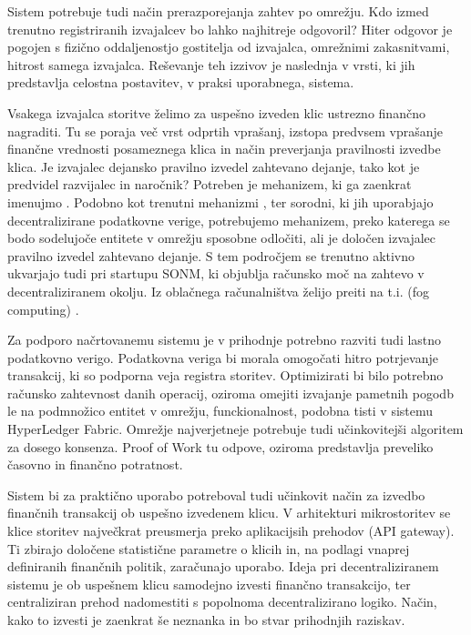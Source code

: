 \documentclass[a4paper, 12pt]{book}
\begin{document}
Sistem potrebuje tudi način prerazporejanja zahtev po omrežju.
Kdo izmed trenutno registriranih izvajalcev bo lahko najhitreje odgovoril?
Hiter odgovor je pogojen s fizično oddaljenostjo gostitelja od izvajalca, omrežnimi zakasnitvami, hitrost samega izvajalca. Reševanje teh izzivov je naslednja v vrsti, ki jih predstavlja celostna postavitev, v praksi uporabnega, sistema.


Vsakega izvajalca storitve želimo za uspešno izveden klic ustrezno finančno nagraditi. Tu se poraja več vrst odprtih vprašanj, izstopa predvsem vprašanje finančne vrednosti posameznega klica in način preverjanja pravilnosti izvedbe klica.
Je izvajalec dejansko pravilno izvedel zahtevano dejanje, tako kot je predvidel razvijalec in naročnik?
Potreben je mehanizem, ki ga zaenkrat imenujmo .
Podobno kot trenutni mehanizmi ,  ter sorodni, ki jih uporabjajo decentralizirane podatkovne verige, potrebujemo mehanizem, preko katerega se bodo sodelujoče entitete v omrežju sposobne odločiti, ali je določen izvajalec pravilno izvedel zahtevano dejanje.
S tem področjem se trenutno aktivno ukvarjajo tudi pri startupu SONM, ki objublja računsko moč na zahtevo v decentraliziranem okolju. Iz oblačnega računalništva želijo preiti na t.i.  (fog computing) \cite{Sonm}.

Za podporo načrtovanemu sistemu je v prihodnje potrebno razviti tudi lastno podatkovno verigo.
Podatkovna veriga bi morala omogočati hitro potrjevanje transakcij, ki so podporna veja registra storitev.
Optimizirati bi bilo potrebno računsko zahtevnost danih operacij, oziroma omejiti izvajanje pametnih pogodb le na podmnožico entitet v omrežju, funckionalnost, podobna tisti v sistemu HyperLedger Fabric.
Omrežje najverjetneje potrebuje tudi učinkovitejši algoritem za dosego konsenza.
Proof of Work tu odpove, oziroma predstavlja preveliko časovno in finančno potratnost.

Sistem bi za praktično uporabo potreboval tudi učinkovit način za izvedbo finančnih transakcij ob uspešno izvedenem klicu.
V arhitekturi mikrostoritev se klice storitev največkrat preusmerja preko aplikacijsih prehodov (API gateway).
Ti zbirajo določene statistične parametre o klicih in, na podlagi vnaprej definiranih finančnih politik, zaračunajo uporabo.
Ideja pri decentraliziranem sistemu je ob uspešnem klicu samodejno izvesti finančno transakcijo, ter centraliziran prehod nadomestiti s popolnoma decentralizirano logiko.
Način, kako to izvesti je zaenkrat še neznanka in bo stvar prihodnjih raziskav.
\end{document}
